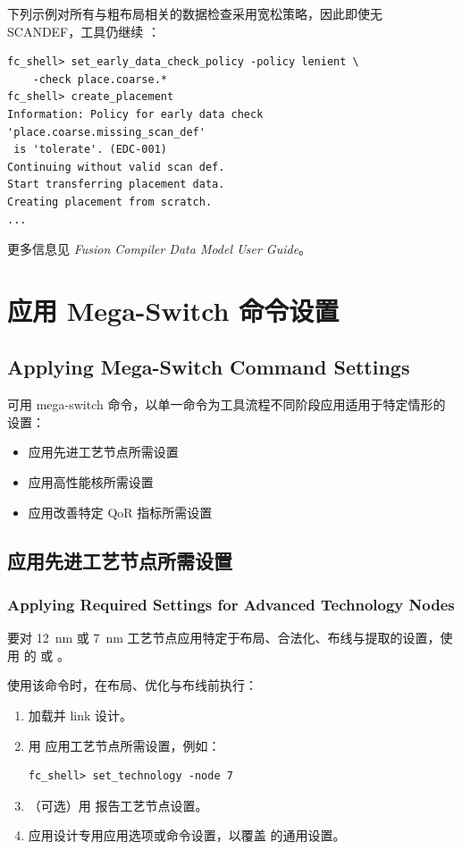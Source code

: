 下列示例对所有与粗布局相关的数据检查采用宽松策略，因此即使无 SCANDEF，工具仍继续 ：
\begin{lstlisting}
fc_shell> set_early_data_check_policy -policy lenient \
    -check place.coarse.*
fc_shell> create_placement
Information: Policy for early data check 'place.coarse.missing_scan_def'
 is 'tolerate'. (EDC-001)
Continuing without valid scan def.
Start transferring placement data.
Creating placement from scratch.
...
\end{lstlisting}

更多信息见 \textit{Fusion Compiler Data Model User Guide}。

\section{应用 Mega-Switch 命令设置}
\subsection*{Applying Mega-Switch Command Settings}

可用 mega-switch 命令，以单一命令为工具流程不同阶段应用适用于特定情形的设置：
\begin{itemize}
  \item 应用先进工艺节点所需设置
  \item 应用高性能核所需设置
  \item 应用改善特定 QoR 指标所需设置
\end{itemize}

\subsection{应用先进工艺节点所需设置}
\subsubsection*{Applying Required Settings for Advanced Technology Nodes}

要对 12~nm 或 7~nm 工艺节点应用特定于布局、合法化、布线与提取的设置，使用  的  或 。

使用该命令时，在布局、优化与布线前执行：
\begin{enumerate}
  \item 加载并 link 设计。
  \item 用  应用工艺节点所需设置，例如：
\begin{lstlisting}
fc_shell> set_technology -node 7
\end{lstlisting}
  \item （可选）用  报告工艺节点设置。
  \item 应用设计专用应用选项或命令设置，以覆盖  的通用设置。
\end{enumerate}

